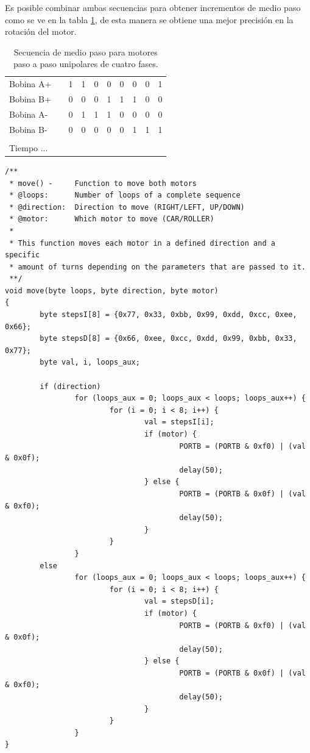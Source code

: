 Es posible combinar ambas secuencias para obtener incrementos de medio paso
como se ve en la tabla \ref{tab:seq_motors_2}, de esta manera se obtiene una
mejor precisi\'on en la rotaci\'on del motor.

\begin{table}[htp]
\centering
\begin{tabular}{l c|c|c|c|c|c|c|c|c|}
Bobina A+ & & 1 & 1 & 0 & 0 & 0 & 0 & 0 & 1\\	
Bobina B+ & & 0 & 0 & 0 & 1 & 1 & 1 & 0 & 0\\
Bobina A- &	& 0 & 1 & 1 & 1 & 0 & 0 & 0 & 0\\
Bobina B- &	& 0 & 0 & 0 & 0 & 0 & 1 & 1 & 1\\
							\\
Tiempo	...					\\
\end{tabular}
\caption{Secuencia de medio paso para motores paso a paso unipolares de cuatro
fases.}
\label{tab:seq_motors_2}
\end{table}



\clearpage
\begin{lstlisting}
/**
 * move() -     Function to move both motors
 * @loops:      Number of loops of a complete sequence
 * @direction:  Direction to move (RIGHT/LEFT, UP/DOWN)
 * @motor:      Which motor to move (CAR/ROLLER) 
 *
 * This function moves each motor in a defined direction and a specific
 * amount of turns depending on the parameters that are passed to it.
 **/
void move(byte loops, byte direction, byte motor) 
{
        byte stepsI[8] = {0x77, 0x33, 0xbb, 0x99, 0xdd, 0xcc, 0xee, 0x66};
        byte stepsD[8] = {0x66, 0xee, 0xcc, 0xdd, 0x99, 0xbb, 0x33, 0x77}; 
        byte val, i, loops_aux;

        if (direction)
                for (loops_aux = 0; loops_aux < loops; loops_aux++) {
                        for (i = 0; i < 8; i++) {		
                                val = stepsI[i];
                                if (motor) {
                                        PORTB = (PORTB & 0xf0) | (val & 0x0f);
                                        delay(50);
                                } else {
                                        PORTB = (PORTB & 0x0f) | (val & 0xf0);
                                        delay(50);
                                }
                        }
                }
        else
                for (loops_aux = 0; loops_aux < loops; loops_aux++) {
                        for (i = 0; i < 8; i++) {		
                                val = stepsD[i];
                                if (motor) {
                                        PORTB = (PORTB & 0xf0) | (val & 0x0f);
                                        delay(50);
                                } else {
                                        PORTB = (PORTB & 0x0f) | (val & 0xf0);
                                        delay(50);
                                }
                        }
                }
}
\end{lstlisting}


